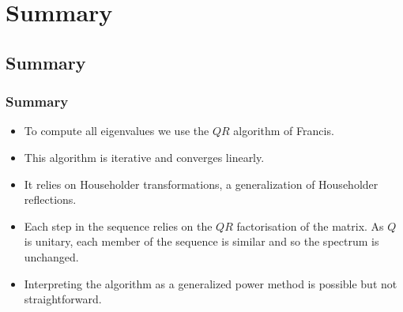 \documentclass{beamer}
\begin{document}
\section{Summary}

\subsection{Summary}

\begin{frame}
  \frametitle{Summary}

  \begin{itemize}
  \item To compute all eigenvalues we use the $QR$ algorithm of Francis.
  \item This algorithm is iterative and converges linearly.
  \item It relies on Householder transformations, a generalization of
    Householder reflections.
  \item Each step in the sequence relies on the $QR$ factorisation of
    the matrix. As $Q$ is unitary, each member of the sequence is
    similar and so the spectrum is unchanged.
  \item Interpreting the algorithm as a generalized power method is
    possible but not straightforward.
  \end{itemize}

\end{frame}
\end{document}
